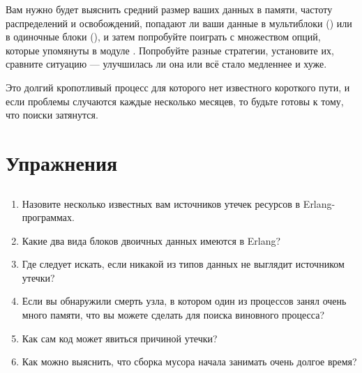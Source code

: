 Вам нужно будет выяснить средний размер ваших данных в памяти, частоту распределений и освобождений, попадают ли ваши данные в мультиблоки () или в одиночные блоки (), и затем попробуйте поиграть с множеством опций, которые упомянуты в модуле . Попробуйте разные стратегии, установите их, сравните ситуацию --- улучшилась ли она или всё стало медленнее и хуже.

Это долгий кропотливый процесс для которого нет известного короткого пути, и если проблемы случаются каждые несколько месяцев, то будьте готовы к тому, что поиски затянутся.


\section{Упражнения}

\subsection*{\ReviewTitle{}}

\begin{enumerate}
	\item Назовите несколько известных вам источников утечек ресурсов в Erlang-программах.
	\item Какие два вида блоков двоичных данных имеются в Erlang?
	\item Где следует искать, если никакой из типов данных не выглядит источником утечки?
	\item Если вы обнаружили смерть узла, в котором один из процессов занял очень много памяти, что вы можете сделать для поиска виновного процесса?
	\item Как сам код может явиться причиной утечки?
	\item Как можно выяснить, что сборка мусора начала занимать очень долгое время?
\end{enumerate}

